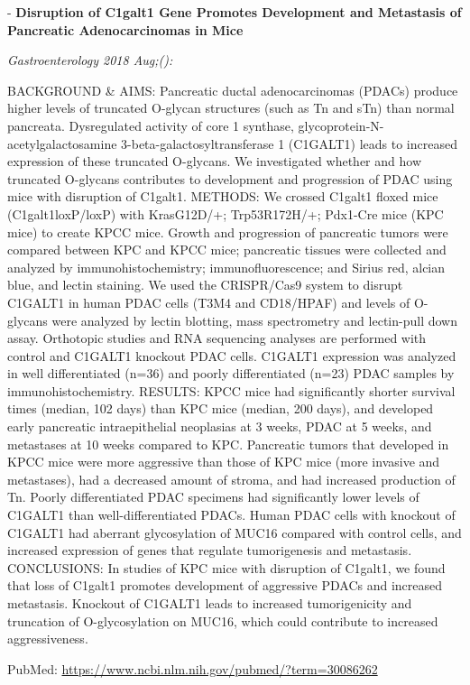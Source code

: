 \documentclass[]{article}
\begin{document}
 - \textbf{Disruption of C1galt1 Gene Promotes Development and
Metastasis of Pancreatic Adenocarcinomas in Mice}

\emph{Gastroenterology 2018 Aug;():}

BACKGROUND \& AIMS: Pancreatic ductal adenocarcinomas (PDACs) produce
higher levels of truncated O-glycan structures (such as Tn and sTn) than
normal pancreata. Dysregulated activity of core 1 synthase,
glycoprotein-N-acetylgalactosamine 3-beta-galactosyltransferase 1
(C1GALT1) leads to increased expression of these truncated O-glycans. We
investigated whether and how truncated O-glycans contributes to
development and progression of PDAC using mice with disruption of
C1galt1. METHODS: We crossed C1galt1 floxed mice (C1galt1loxP/loxP) with
KrasG12D/+; Trp53R172H/+; Pdx1-Cre mice (KPC mice) to create KPCC mice.
Growth and progression of pancreatic tumors were compared between KPC
and KPCC mice; pancreatic tissues were collected and analyzed by
immunohistochemistry; immunofluorescence; and Sirius red, alcian blue,
and lectin staining. We used the CRISPR/Cas9 system to disrupt C1GALT1
in human PDAC cells (T3M4 and CD18/HPAF) and levels of O-glycans were
analyzed by lectin blotting, mass spectrometry and lectin-pull down
assay. Orthotopic studies and RNA sequencing analyses are performed with
control and C1GALT1 knockout PDAC cells. C1GALT1 expression was analyzed
in well differentiated (n=36) and poorly differentiated (n=23) PDAC
samples by immunohistochemistry. RESULTS: KPCC mice had significantly
shorter survival times (median, 102 days) than KPC mice (median, 200
days), and developed early pancreatic intraepithelial neoplasias at 3
weeks, PDAC at 5 weeks, and metastases at 10 weeks compared to KPC.
Pancreatic tumors that developed in KPCC mice were more aggressive than
those of KPC mice (more invasive and metastases), had a decreased amount
of stroma, and had increased production of Tn. Poorly differentiated
PDAC specimens had significantly lower levels of C1GALT1 than
well-differentiated PDACs. Human PDAC cells with knockout of C1GALT1 had
aberrant glycosylation of MUC16 compared with control cells, and
increased expression of genes that regulate tumorigenesis and
metastasis. CONCLUSIONS: In studies of KPC mice with disruption of
C1galt1, we found that loss of C1galt1 promotes development of
aggressive PDACs and increased metastasis. Knockout of C1GALT1 leads to
increased tumorigenicity and truncation of O-glycosylation on MUC16,
which could contribute to increased aggressiveness.

PubMed: \url{https://www.ncbi.nlm.nih.gov/pubmed/?term=30086262}
\end{document}
